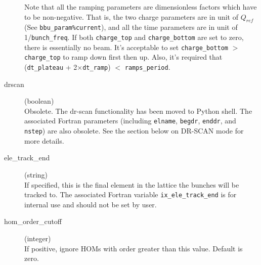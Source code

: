 \documentclass{hitec}
\newcommand{\Newline}{\hfil \\}
\begin{document}
\begin{description}
Note that all the ramping parameters are dimensionless factors which have to be non-negative. That is, the two charge parameters are in unit of $Q_{ref}$ (See \texttt{bbu_param\%current}), and all the time parameters are in unit of 1/\texttt{bunch_freq}. If both \texttt{charge_top} and \texttt{charge_bottom} are set to zero, there is essentially no beam. It's acceptable to set \texttt{charge_bottom} $>$ \texttt{charge_top} to ramp down first then up. Also, it's required that (\texttt{dt_plateau} + 2$\times$\texttt{dt_ramp}) $<$ \texttt{ramps_period}.  
%
\item[drscan] (boolean)\Newline
Obsolete. The dr-scan functionality has been moved to Python shell. The associated Fortran parameters (including \texttt{elname}, \texttt{begdr}, \texttt{enddr}, and \texttt{nstep}) are also obsolete. See the section below on DR-SCAN mode for more details.

\item[ele_track_end] (string) \Newline
If specified, this is the final element in the lattice the bunches will be tracked to. The associated Fortran variable \texttt{ix_ele_track_end} is for internal use and should not be set by user.

\item[hom_order_cutoff] (integer)\Newline
If positive, ignore HOMs with order greater than this value. Default is zero. 


\end{description}
\end{document}
